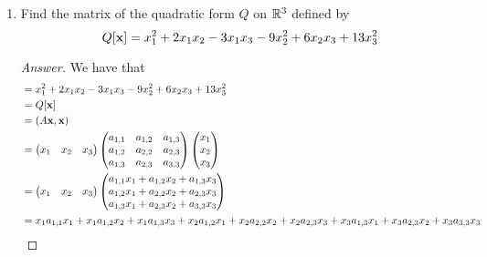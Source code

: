 \documentclass[../psets.tex]{subfiles}
\begin{document}
\begin{enumerate}[label={\textbf{1.\arabic*.}}]
\begin{proof}[Answer]
\begin{equation*}
        \end{equation*}
    \end{proof}
    \item Find the matrix of the quadratic form $Q$ on $\mathbb{R}^3$ defined by
    \begin{equation*}
        Q[\mathbf{x}] = x_1^2+2x_1x_2-3x_1x_3-9x_2^2+6x_2x_3+13x_3^2
    \end{equation*}
    \begin{proof}[Answer]
        We have that
        \begin{align*}
            &= x_1^2+2x_1x_2-3x_1x_3-9x_2^2+6x_2x_3+13x_3^2\\
            &= Q[\x]\\
            &= (A\x,\x)\\
            &=
            \begin{pmatrix}
                x_1 & x_2 & x_3\\
            \end{pmatrix}
            \begin{pmatrix}
                a_{1,1} & a_{1,2} & a_{1,3}\\
                a_{1,2} & a_{2,2} & a_{2,3}\\
                a_{1,3} & a_{2,3} & a_{3,3}\\
            \end{pmatrix}
            \begin{pmatrix}
                x_1\\
                x_2\\
                x_3\\
            \end{pmatrix}\\
            &=
            \begin{pmatrix}
                x_1 & x_2 & x_3\\
            \end{pmatrix}
            \begin{pmatrix}
                a_{1,1}x_1+a_{1,2}x_2+a_{1,3}x_3\\
                a_{1,2}x_1+a_{2,2}x_2+a_{2,3}x_3\\
                a_{1,3}x_1+a_{2,3}x_2+a_{3,3}x_3\\
            \end{pmatrix}\\
            &= x_1a_{1,1}x_1+x_1a_{1,2}x_2+x_1a_{1,3}x_3+x_2a_{1,2}x_1+x_2a_{2,2}x_2+x_2a_{2,3}x_3+x_3a_{1,3}x_1+x_3a_{2,3}x_2+x_3a_{3,3}x_3\\

\end{align*}
\end{proof}
\end{enumerate}
\end{document}

